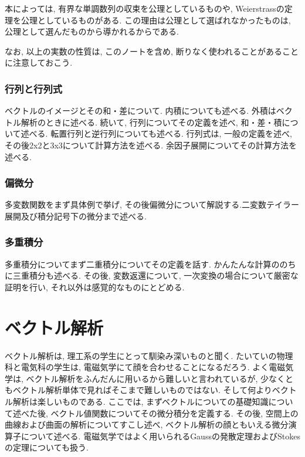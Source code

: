 \documentclass[a4j,dvipdfmx]{jsarticle}
\numberwithin{equation}{section}
\begin{document}
            本によっては, 有界な単調数列の収束を公理としているものや, Weierstrassの定理を公理としているものがある. この理由は公理として選ばれなかったものは, 公理として選んだものから導かれるからである.

            なお, 以上の実数の性質は, このノートを含め, 断りなく使われることがあることに注意しておこう.
    \clearpage

    \clearpage
    \section{行列と行列式}
        ベクトルのイメージとその和・差について. 内積についても述べる. 外積はベクトル解析のときに述べる. 続いて, 行列についてその定義を述べ, 和・差・積について述べる.
        転置行列と逆行列についても述べる. 行列式は, 一般の定義を述べ, その後2x2と3x3について計算方法を述べる. 余因子展開についてその計算方法を述べる.
    \clearpage
    \section{偏微分}
        多変数関数をまず具体例で挙げ, その後偏微分について解説する.二変数テイラー展開及び積分記号下の微分まで述べる.
    \clearpage
    \section{多重積分}
        多重積分についてまず二重積分についてその定義を話す. かんたんな計算ののちに三重積分も述べる. その後, 変数返還について, 一次変換の場合について厳密な証明を行い, 
        それ以外は感覚的なものにとどめる.
    \clearpage
    
    \part{ベクトル解析}
    \begin{screen}
        ベクトル解析は, 理工系の学生にとって馴染み深いものと聞く. たいていの物理科と電気科の学生は, 電磁気学にて顔を合わせることになるだろう.
        よく電磁気学は, ベクトル解析をふんだんに用いるから難しいと言われているが, 少なくともベクトル解析単体で見ればそこまで難しいものではない. 
        そして何よりベクトル解析は楽しいものである. ここでは, まずベクトルについての基礎知識について述べた後, ベクトル値関数についてその微分積分を定義する.
        その後, 空間上の曲線および曲面の解析についてすこし述べ, ベクトル解析の顔ともいえる微分演算子について述べる.
        電磁気学ではよく用いられるGaussの発散定理およびStokesの定理についても扱う. 
    \end{screen}
    \clearpage
\end{document}
